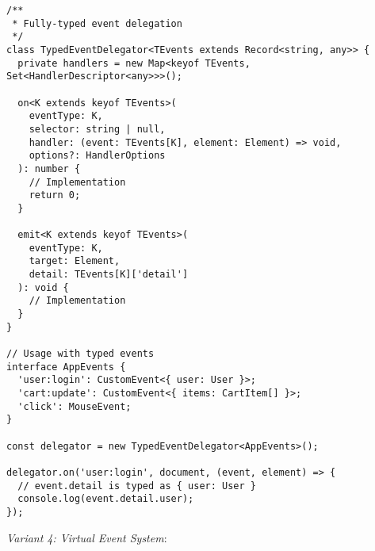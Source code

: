 \documentclass[11pt]{article}
\begin{document}
\begin{verbatim}
/**
 * Fully-typed event delegation
 */
class TypedEventDelegator<TEvents extends Record<string, any>> {
  private handlers = new Map<keyof TEvents, Set<HandlerDescriptor<any>>>();
  
  on<K extends keyof TEvents>(
    eventType: K,
    selector: string | null,
    handler: (event: TEvents[K], element: Element) => void,
    options?: HandlerOptions
  ): number {
    // Implementation
    return 0;
  }
  
  emit<K extends keyof TEvents>(
    eventType: K,
    target: Element,
    detail: TEvents[K]['detail']
  ): void {
    // Implementation
  }
}

// Usage with typed events
interface AppEvents {
  'user:login': CustomEvent<{ user: User }>;
  'cart:update': CustomEvent<{ items: CartItem[] }>;
  'click': MouseEvent;
}

const delegator = new TypedEventDelegator<AppEvents>();

delegator.on('user:login', document, (event, element) => {
  // event.detail is typed as { user: User }
  console.log(event.detail.user);
});
\end{verbatim}

\emph{Variant 4: Virtual Event System}:
\end{document}
